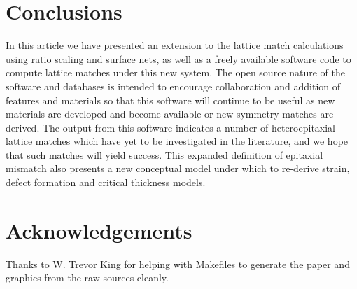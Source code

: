 \documentclass[final,5p,times,twocolumn]{elsarticle}
\begin{document}
\section{Conclusions}
In this article we have presented an extension to the lattice match calculations using ratio scaling and surface nets, as well as a freely available software code to compute lattice matches under this new system. The open source nature of the software and databases is intended to encourage collaboration and addition of features and materials so that this software will continue to be useful as new materials are developed and become available or new symmetry matches are derived. The output from this software indicates a number of heteroepitaxial lattice matches which have yet to be investigated in the literature, and we hope that such matches will yield success. This expanded definition of epitaxial mismatch also presents a new conceptual model under which to re-derive strain, defect formation and critical thickness models.

\section{Acknowledgements}
Thanks to W. Trevor King for helping with Makefiles to generate the paper and graphics from the raw sources cleanly.



 


\end{document}
